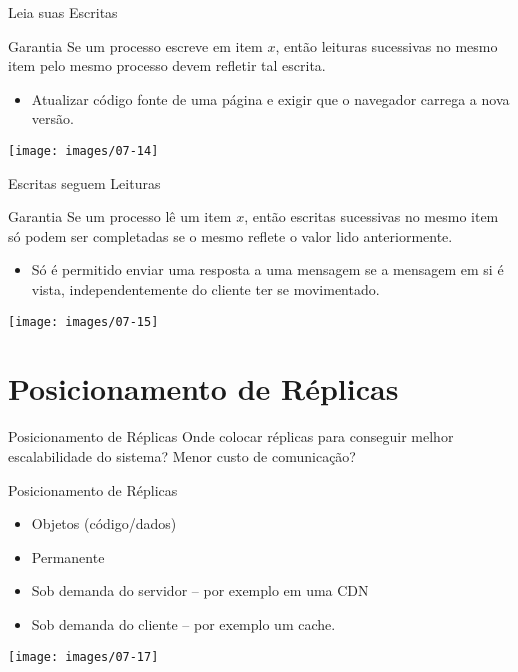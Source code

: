 \begin{frame}{Leia suas Escritas}
\begin{block}{Garantia}
	Se um processo escreve em item $x$, então leituras sucessivas no mesmo item pelo mesmo processo devem refletir tal escrita.
\end{block}
\begin{itemize}
	\item Atualizar código fonte de uma página e exigir que o navegador carrega a nova versão.
\end{itemize}


\texttt{[image: images/07-14]}

\end{frame}


\begin{frame}{Escritas seguem Leituras}
\begin{block}{Garantia}
	Se um processo lê um item $x$, então escritas sucessivas no mesmo item só podem ser completadas se o mesmo reflete o valor lido anteriormente.
\end{block}
\begin{itemize}
	\item Só é permitido enviar uma resposta a uma mensagem se a mensagem em si é vista, independentemente do cliente ter se movimentado.
\end{itemize}

\texttt{[image: images/07-15]}
\end{frame}



\section{Posicionamento de Réplicas}
\begin{frame}{Posicionamento de Réplicas}
Onde colocar réplicas para conseguir melhor escalabilidade do sistema? Menor custo de comunicação?
\end{frame}

\begin{frame}{Posicionamento de Réplicas}
\begin{itemize}
	\item Objetos (código/dados)
	\item Permanente
	\item Sob demanda do servidor -- por exemplo em uma CDN
	\item Sob demanda do cliente -- por exemplo um cache.
\end{itemize}

\texttt{[image: images/07-17]}
\end{frame}



